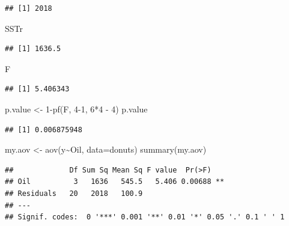 \documentclass[
]{book}
\newenvironment{Shaded}{\begin{snugshade}}{\end{snugshade}}
\newcommand{\AttributeTok}[1]{\textcolor[rgb]{0.77,0.63,0.00}{#1}}
\newcommand{\DecValTok}[1]{\textcolor[rgb]{0.00,0.00,0.81}{#1}}
\newcommand{\FunctionTok}[1]{\textcolor[rgb]{0.00,0.00,0.00}{#1}}
\newcommand{\NormalTok}[1]{#1}
\newcommand{\OtherTok}[1]{\textcolor[rgb]{0.56,0.35,0.01}{#1}}
\newcommand{\SpecialCharTok}[1]{\textcolor[rgb]{0.00,0.00,0.00}{#1}}
\begin{document}
\begin{verbatim}
## [1] 2018
\end{verbatim}

\begin{Shaded}
\begin{Highlighting}[]
\NormalTok{SSTr}
\end{Highlighting}
\end{Shaded}

\begin{verbatim}
## [1] 1636.5
\end{verbatim}

\begin{Shaded}
\begin{Highlighting}[]
\NormalTok{F}
\end{Highlighting}
\end{Shaded}

\begin{verbatim}
## [1] 5.406343
\end{verbatim}

\begin{Shaded}
\begin{Highlighting}[]
\NormalTok{p.value }\OtherTok{\textless{}{-}} \DecValTok{1}\SpecialCharTok{{-}}\FunctionTok{pf}\NormalTok{(F, }\DecValTok{4{-}1}\NormalTok{, }\DecValTok{6}\SpecialCharTok{*}\DecValTok{4} \SpecialCharTok{{-}} \DecValTok{4}\NormalTok{)}
\NormalTok{p.value}
\end{Highlighting}
\end{Shaded}

\begin{verbatim}
## [1] 0.006875948
\end{verbatim}

\begin{Shaded}
\begin{Highlighting}[]
\NormalTok{my.aov }\OtherTok{\textless{}{-}} \FunctionTok{aov}\NormalTok{(y}\SpecialCharTok{\textasciitilde{}}\NormalTok{Oil, }\AttributeTok{data=}\NormalTok{donuts)}
\FunctionTok{summary}\NormalTok{(my.aov)}
\end{Highlighting}
\end{Shaded}

\begin{verbatim}
##             Df Sum Sq Mean Sq F value  Pr(>F)   
## Oil          3   1636   545.5   5.406 0.00688 **
## Residuals   20   2018   100.9                   
## ---
## Signif. codes:  0 '***' 0.001 '**' 0.01 '*' 0.05 '.' 0.1 ' ' 1
\end{verbatim}
\end{document}
